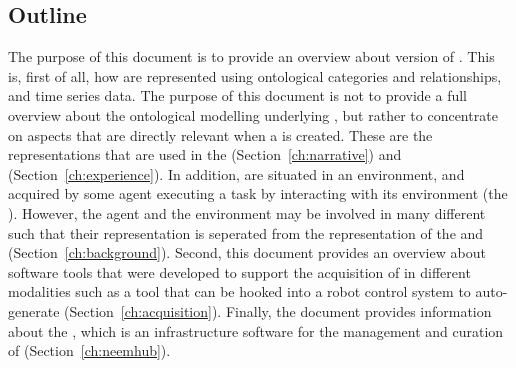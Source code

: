 \subsection{Outline} %
The purpose of this document is to provide an overview about version \neemversion of \neems.
This is, first of all, how \neems are represented using ontological categories and relationships, and time series data.
The purpose of this document is not to provide a full overview about the ontological modelling underlying \neems, but rather to concentrate on aspects that are directly relevant when a \neem is created.
These are the representations that are used in the \neemnar (Section~\ref{ch:narrative}) and \neemexp (Section~\ref{ch:experience}).
In addition, \neems are situated in an environment, and acquired by some agent executing a task by interacting with its environment (the \neembak).
However, the agent and the environment may be involved in many different \neems such that their representation is seperated from the representation of the \neemnar and \neemexp (Section~\ref{ch:background}).
Second, this document provides an overview about software tools that were developed to support the acquisition of \neems in different modalities such as a tool that can be hooked into a robot control system to auto-generate \neems (Section~\ref{ch:acquisition}).
Finally, the document provides information about the \neemhub, which is an infrastructure software for the management and curation of \neems (Section~\ref{ch:neemhub}).


